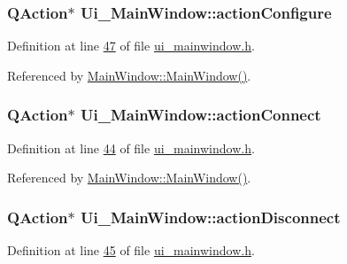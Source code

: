 \hypertarget{a00027_a3860abde3cfd3f6170e28fddde73f11e}{
\subsubsection[{action\+Configure}]{\setlength{\rightskip}{0pt plus 5cm}Q\+Action$\ast$ Ui\+\_\+\+Main\+Window\+::action\+Configure}}\label{a00027_a3860abde3cfd3f6170e28fddde73f11e}


Definition at line \hyperlink{a00052_source_l00047}{47} of file \hyperlink{a00052_source}{ui\+\_\+mainwindow.\+h}.



Referenced by \hyperlink{a00038_source_l00024}{Main\+Window\+::\+Main\+Window()}.

\hypertarget{a00027_aa0785566311fc48271690fb68b1d4c5f}{
\subsubsection[{action\+Connect}]{\setlength{\rightskip}{0pt plus 5cm}Q\+Action$\ast$ Ui\+\_\+\+Main\+Window\+::action\+Connect}}\label{a00027_aa0785566311fc48271690fb68b1d4c5f}


Definition at line \hyperlink{a00052_source_l00044}{44} of file \hyperlink{a00052_source}{ui\+\_\+mainwindow.\+h}.



Referenced by \hyperlink{a00038_source_l00024}{Main\+Window\+::\+Main\+Window()}.

\hypertarget{a00027_a8a16b3aef75b279eaaa887152d2f746b}{
\subsubsection[{action\+Disconnect}]{\setlength{\rightskip}{0pt plus 5cm}Q\+Action$\ast$ Ui\+\_\+\+Main\+Window\+::action\+Disconnect}}\label{a00027_a8a16b3aef75b279eaaa887152d2f746b}


Definition at line \hyperlink{a00052_source_l00045}{45} of file \hyperlink{a00052_source}{ui\+\_\+mainwindow.\+h}.



